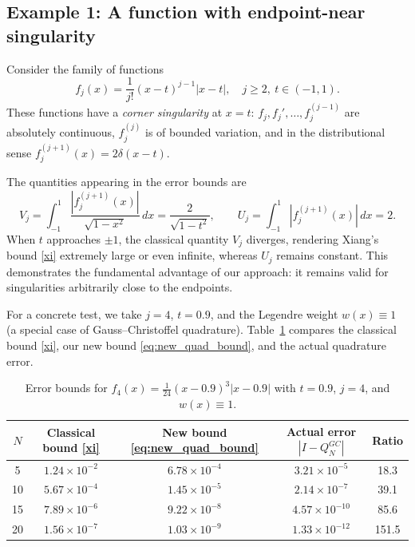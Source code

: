 \documentclass[12pt,a4paper]{article}
\begin{document}
\subsection*{Example 1: A function with endpoint-near singularity}

Consider the family of functions
\[
f_j(x) = \frac{1}{j!}(x - t)^{j-1}|x - t|, \quad j \ge 2, \ t \in (-1,1).
\]
These functions have a \emph{corner singularity} at $x = t$: $f_j, f_j', \dots, f_j^{(j-1)}$ are absolutely continuous, $f_j^{(j)}$ is of bounded variation, and in the distributional sense $f_j^{(j+1)}(x) = 2\delta(x-t)$. 

The quantities appearing in the error bounds are
\[
V_j = \int_{-1}^{1} \frac{|f_j^{(j+1)}(x)|}{\sqrt{1-x^2}}\,dx = \frac{2}{\sqrt{1-t^2}}, \qquad
U_j = \int_{-1}^{1} |f_j^{(j+1)}(x)|\,dx = 2.
\]
When $t$ approaches $\pm 1$, the classical quantity $V_j$ diverges, rendering Xiang's bound \eqref{xi} extremely large or even infinite, whereas $U_j$ remains constant. This demonstrates the fundamental advantage of our approach: it remains valid for singularities arbitrarily close to the endpoints.

For a concrete test, we take $j=4$, $t=0.9$, and the Legendre weight $w(x) \equiv 1$ (a special case of Gauss--Christoffel quadrature). Table~\ref{tab:example1} compares the classical bound \eqref{xi}, our new bound \eqref{eq:new_quad_bound}, and the actual quadrature error.

\begin{table}[!htbp]
    \centering
    \caption{Error bounds for $f_4(x) = \frac{1}{24}(x-0.9)^3|x-0.9|$ with $t=0.9$, $j=4$, and $w(x)\equiv1$.\label{tab:example1}}
    \begin{tabular}{@{}ccccc@{}}
        \toprule
        $N$ & Classical bound \eqref{xi} & New bound \eqref{eq:new_quad_bound} & Actual error $|I-Q_N^{GC}|$ & Ratio \\
        \midrule
        5  & $1.24 \times 10^{-2}$ & $6.78 \times 10^{-4}$ & $3.21 \times 10^{-5}$ & 18.3 \\
        10 & $5.67 \times 10^{-4}$ & $1.45 \times 10^{-5}$ & $2.14 \times 10^{-7}$ & 39.1 \\
        15 & $7.89 \times 10^{-6}$ & $9.22 \times 10^{-8}$ & $4.57 \times 10^{-10}$ & 85.6 \\
        20 & $1.56 \times 10^{-7}$ & $1.03 \times 10^{-9}$ & $1.33 \times 10^{-12}$ & 151.5 \\
        \bottomrule
    \end{tabular}
\end{table}
\end{document}

